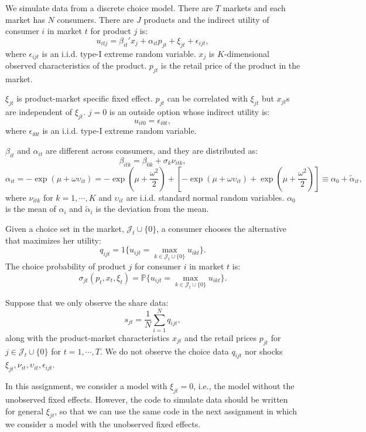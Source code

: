 \documentclass[]{book}
\begin{document}
We simulate data from a discrete choice model. There are \(T\) markets
and each market has \(N\) consumers. There are \(J\) products and the
indirect utility of consumer \(i\) in market \(t\) for product \(j\) is:
\[
u_{itj} = \beta_{it}' x_j + \alpha_{it} p_{jt} + \xi_{jt} + \epsilon_{ijt},
\] where \(\epsilon_{ijt}\) is an i.i.d. type-I extreme random variable.
\(x_j\) is \(K\)-dimensional observed characteristics of the product.
\(p_{jt}\) is the retail price of the product in the market.

\(\xi_{jt}\) is product-market specific fixed effect. \(p_{jt}\) can be
correlated with \(\xi_{jt}\) but \(x_{jt}\)s are independent of
\(\xi_{jt}\). \(j = 0\) is an outside option whose indirect utility is:
\[
u_{it0} = \epsilon_{i0t},
\] where \(\epsilon_{i0t}\) is an i.i.d. type-I extreme random variable.

\(\beta_{it}\) and \(\alpha_{it}\) are different across consumers, and
they are distributed as: \[
\beta_{itk} = \beta_{0k} + \sigma_k \nu_{itk},
\] \[
\alpha_{it} = - \exp(\mu + \omega \upsilon_{it}) = - \exp(\mu + \frac{\omega^2}{2}) + [- \exp(\mu + \omega \upsilon_{it}) + \exp(\mu + \frac{\omega^2}{2})] \equiv \alpha_0 + \tilde{\alpha}_{it},
\] where \(\nu_{itk}\) for \(k = 1, \cdots, K\) and \(\upsilon_{it}\)
are i.i.d. standard normal random variables. \(\alpha_0\) is the mean of
\(\alpha_i\) and \(\tilde{\alpha}_i\) is the deviation from the mean.

Given a choice set in the market, \(\mathcal{J}_t \cup \{0\}\), a
consumer chooses the alternative that maximizes her utility: \[
q_{ijt} = 1\{u_{ijt} = \max_{k \in \mathcal{J}_t \cup \{0\}} u_{ikt}\}.
\] The choice probability of product \(j\) for consumer \(i\) in market
\(t\) is: \[
\sigma_{jt}(p_t, x_t, \xi_t) = \mathbb{P}\{u_{ijt} = \max_{k \in \mathcal{J}_t \cup \{0\}} u_{ikt}\}.
\]

Suppose that we only observe the share data: \[
s_{jt} = \frac{1}{N} \sum_{i = 1}^N q_{ijt},
\] along with the product-market characteristics \(x_{jt}\) and the
retail prices \(p_{jt}\) for \(j \in \mathcal{J}_t \cup \{0\}\) for
\(t = 1, \cdots, T\). We do not observe the choice data \(q_{ijt}\) nor
shocks \(\xi_{jt}, \nu_{it}, \upsilon_{it}, \epsilon_{ijt}\).

In this assignment, we consider a model with \(\xi_{jt} = 0\), i.e., the
model without the unobserved fixed effects. However, the code to
simulate data should be written for general \(\xi_{jt}\), so that we can
use the same code in the next assignment in which we consider a model
with the unobserved fixed effects.
\end{document}
